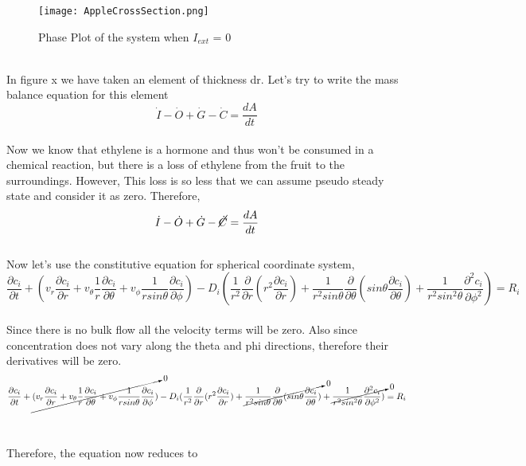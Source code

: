 \documentclass[10pt, a4paper]{article}
\begin{document}
\begin{figure}[H]
    \centering
    \texttt{[image: AppleCrossSection.png]}
    \caption{Phase Plot of the system when $I_{ext}$ = 0}
\end{figure} \\

In figure x we have taken an element of thickness dr. Let’s try to write the mass balance equation for this element \\

\begin{equation}
    \dot{I} - \dot{O} + \dot{G} - \dot{C} = \frac{dA}{dt}
\end{equation}
\\
Now we know that ethylene is a hormone and thus won't be consumed in a chemical reaction, but there is a loss of ethylene from the fruit to the surroundings. However, This loss is so less \cite{SALTVEIT1999279} that we can assume pseudo steady state and consider it as zero. Therefore, \\

\begin{equation}
    \dot{I} - \dot{O} + \dot{G} - \cancel{\dot{C}} = \frac{dA}{dt}
\end{equation}
\\
Now let’s use the constitutive equation for spherical coordinate system,\\
\begin{equation}
    \frac{\partial c_i}{\partial t} + (v_r\frac{\partial c_i}{\partial r} + v_{\theta}\frac{1}{r} \frac{\partial c_i}{\partial \theta} + v_{\phi}\frac{1}{rsin\theta } \frac{\partial c_i}{\partial \phi }) - D_i(\frac{1}{r^2}\frac{\partial}{\partial r}(r^2\frac{\partial c_i}{\partial r}) + \frac{1}{r^2sin\theta }\frac{\partial}{\partial \theta}(sin\theta\frac{\partial c_i}{\partial \theta }) + \frac{1}{r^2sin^2\theta }\frac{\partial^2c_i}{\partial \phi^2}) = R_i
\end{equation} \\
Since there is no bulk flow all the velocity terms will be zero. Also since concentration does not vary along the theta and phi directions, therefore their derivatives will be zero. \\
\begin{equation}
    \frac{\partial c_i}{\partial t} + \cancelto{0}{(v_r\frac{\partial c_i}{\partial r} + v_{\theta}\frac{1}{r} \frac{\partial c_i}{\partial \theta} + v_{\phi}\frac{1}{rsin\theta } \frac{\partial c_i}{\partial \phi })} - D_i(\frac{1}{r^2}\frac{\partial}{\partial r}(r^2\frac{\partial c_i}{\partial r}) + \cancelto{0}{\frac{1}{r^2sin\theta }\frac{\partial}{\partial \theta}(sin\theta\frac{\partial c_i}{\partial \theta })} + \cancelto{0}{\frac{1}{r^2sin^2\theta }\frac{\partial^2c_i}{\partial \phi^2})} = R_i
\end{equation}\\
\\
Therefore, the equation now reduces to\\
\end{document}
